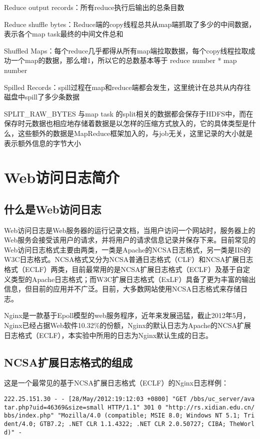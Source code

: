 \begin{enumerate}
Reduce output records：所有reduce执行后输出的总条目数 

Reduce shuffle bytes：Reduce端的copy线程总共从map端抓取了多少的中间数据，表示各个map task最终的中间文件总和 

Shuffled Maps：每个reduce几乎都得从所有map端拉取数据，每个copy线程拉取成功一个map的数据，那么增1，所以它的总数基本等于 reduce number * map number 

Spilled Records：spill过程在map和reduce端都会发生，这里统计在总共从内存往磁盘中spill了多少条数据 

SPLIT\_RAW\_BYTES 
与map task 的split相关的数据都会保存于HDFS中，而在保存时元数据也相应地存储着数据是以怎样的压缩方式放入的，它的具体类型是什么，这些额外的数据是MapReduce框架加入的，与job无关，这里记录的大小就是表示额外信息的字节大小 

\end{enumerate}
	
	
\section{Web访问日志简介}
\subsection{什么是Web访问日志}
Web访问日志是Web服务器的运行记录文档，当用户访问一个网站时，服务器上的Web服务会接受该用户的请求，并将用户的请求信息记录并保存下来。目前常见的Web访问日志格式主要由两类，一类是Apache的NCSA日志格式，另一类是IIS的W3C日志格式。NCSA格式又分为NCSA普通日志格式（CLF）和NCSA扩展日志格式（ECLF）两类，目前最常用的是NCSA扩展日志格式（ECLF）及基于自定义类型的Apache日志格式；而W3C扩展日志格式（ExLF）具备了更为丰富的输出信息，但目前的应用并不广泛。目前，大多数网站使用NCSA日志格式来存储日志。

Nginx是一款基于Epoll模型的web服务程序，近年来发展迅猛，截止2012年5月，Nginx已经占据Web软件10.32\%的份额\cite{site:netcraft_nginx}，Nginx的默认日志为Apache的NCSA扩展日志格式（ECLF），本实验中所用的日志为Nginx默认生成的日志。

\subsection{NCSA扩展日志格式的组成}
这是一个最常见的基于NCSA扩展日志格式（ECLF）的Nginx日志样例：

\begin{verbatim}
222.25.151.30 - - [28/May/2012:19:12:03 +0800] "GET /bbs/uc_server/ava
tar.php?uid=46369&size=small HTTP/1.1" 301 0 "http://rs.xidian.edu.cn/
bbs/index.php" "Mozilla/4.0 (compatible; MSIE 8.0; Windows NT 5.1; Tri
dent/4.0; GTB7.2; .NET CLR 1.1.4322; .NET CLR 2.0.50727; CIBA; TheWorl
d)" -
\end{verbatim}

